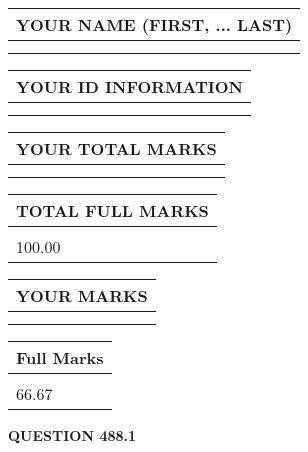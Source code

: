\documentclass{ctexart}
\begin{document}
   
   
   
\newpage 
\setcounter{page}{ 
   488001 } 
   
   
   
   
\noindent\begin{tabular}{|l|}
\hline
YOUR NAME (FIRST, ... LAST)  \\
\hline
 \\ 
 \\ 
\hline
\end{tabular}
\hspace{0.05in} \begin{tabular}{|l|}
\hline
 YOUR   ID   INFORMATION  \\
\hline
 \\ 
 \\ 
\hline
\end{tabular}
   
   
\vspace{0.2in}\noindent\begin{tabular}{|l|}
\hline
YOUR TOTAL MARKS  \\
\hline
 \\ 
 \\ 
\hline
\end{tabular}
\hspace{0.05in} \begin{tabular}{|l|}
\hline
TOTAL FULL MARKS  \\
\hline
 \\ 
100.00 \\
\hline
\end{tabular}
   
   
 \vspace{0.2in}
 
 
 
 
   
   
  
\vspace{0.2in}
  
\noindent\begin{tabular}{|l|}
\hline
 YOUR MARKS  \\
\hline
 \\ 
 \\ 
\hline
\end{tabular}
\hspace{0.05in} \begin{tabular}{|l|}
\hline
 Full Marks  \\
\hline
 \\ 
66.67 \\
\hline
\end{tabular}
{\textbf{\Large{QUESTION
488.1 
}}}
  
\end{document}
